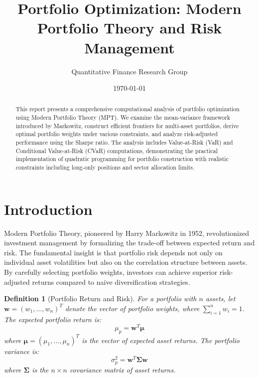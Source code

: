 \documentclass[a4paper, 11pt]{article}
\title{Portfolio Optimization: Modern Portfolio Theory and Risk Management}
\author{Quantitative Finance Research Group}
\date{\today}
\newtheorem{definition}{Definition}[section]
\begin{document}
\maketitle

\begin{abstract}
This report presents a comprehensive computational analysis of portfolio optimization using
Modern Portfolio Theory (MPT). We examine the mean-variance framework introduced by Markowitz,
construct efficient frontiers for multi-asset portfolios, derive optimal portfolio weights under
various constraints, and analyze risk-adjusted performance using the Sharpe ratio. The analysis
includes Value-at-Risk (VaR) and Conditional Value-at-Risk (CVaR) computations, demonstrating
the practical implementation of quadratic programming for portfolio construction with realistic
constraints including long-only positions and sector allocation limits.
\end{abstract}

\section{Introduction}

Modern Portfolio Theory, pioneered by Harry Markowitz in 1952, revolutionized investment
management by formalizing the trade-off between expected return and risk. The fundamental
insight is that portfolio risk depends not only on individual asset volatilities but also
on the correlation structure between assets. By carefully selecting portfolio weights,
investors can achieve superior risk-adjusted returns compared to naive diversification strategies.

\begin{definition}[Portfolio Return and Risk]
For a portfolio with $n$ assets, let $\mathbf{w} = (w_1, \ldots, w_n)^T$ denote the vector
of portfolio weights, where $\sum_{i=1}^n w_i = 1$. The expected portfolio return is:
\begin{equation}
\mu_p = \mathbf{w}^T \boldsymbol{\mu}
\end{equation}
where $\boldsymbol{\mu} = (\mu_1, \ldots, \mu_n)^T$ is the vector of expected asset returns.
The portfolio variance is:
\begin{equation}
\sigma_p^2 = \mathbf{w}^T \boldsymbol{\Sigma} \mathbf{w}
\end{equation}
where $\boldsymbol{\Sigma}$ is the $n \times n$ covariance matrix of asset returns.
\end{definition}
\end{document}
